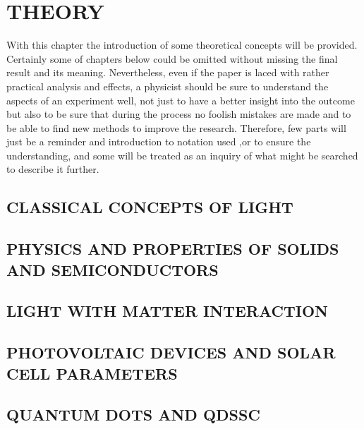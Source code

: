 \chapter{THEORY}

With this chapter the introduction of some theoretical concepts will be provided. Certainly some of chapters below could be omitted without missing the final result and its meaning. Nevertheless, even if the paper is laced with rather practical analysis and effects, a physicist should be sure to understand the aspects of an experiment well, not just to have a better insight into the outcome but also to be sure that during the process no foolish mistakes are made and to be able to find new methods to improve the research. Therefore, few parts will just be a reminder and introduction to notation used ,or to ensure the understanding, and some will be treated as an inquiry of what might be searched to describe it further. 

\section{CLASSICAL CONCEPTS OF LIGHT}

\section{PHYSICS AND PROPERTIES OF SOLIDS AND SEMICONDUCTORS}

\section{LIGHT WITH MATTER INTERACTION}

\section{PHOTOVOLTAIC DEVICES AND SOLAR CELL PARAMETERS}

\section{QUANTUM DOTS AND QDSSC}

